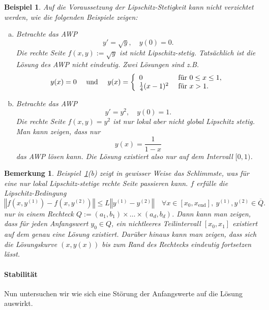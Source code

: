 \documentclass[
]{mycourse}
\theoremstyle{mythm}
\newtheorem{bemerkung}[theorem]{Bemerkung}
\newtheorem{beispiel}[theorem]{Beispiel}
\theoremstyle{break}
\newcommand{\norm}[1]{\left\Vert#1\right\Vert}		%
\begin{document}
\begin{beispiel}\label{bsp:PL}
Auf die Voraussetzung der Lipschitz-Stetigkeit kann nicht verzichtet werden, wie die folgenden
Beispiele zeigen:
\begin{enumerate}[(a)]
\item  Betrachte das AWP
\[
y'=\sqrt{y}, \quad y(0)=0.
\]
Die rechte Seite $f(x,y):=\sqrt{y}$ ist nicht Lipschitz-stetig. Tatsächlich ist die Lösung des AWP nicht eindeutig. Zwei Lösungen sind z.B.
\[
y(x)=0 \quad \mbox{ und } \quad y(x)=\left\{ \begin{array}{l l} 0 & \mbox{ für } 0\leq x\leq 1,\\ \frac{1}{4}(x-1)^2 & \mbox{ für } x>1.
\end{array} \right. 
\]
%
\item Betrachte das AWP
\[
y'=y^2,\quad y(0)=1.
\]
Die rechte Seite $f(x,y)=y^2$ ist nur lokal aber nicht global Lipschitz stetig. Man kann zeigen, dass nur 
\[
y(x)=\frac{1}{1-x}
\]
das AWP lösen kann. Die Lösung existiert also nur auf dem Intervall $[0,1)$.
\end{enumerate}
\end{beispiel}

\begin{bemerkung}
Beispiel~\ref{bsp:PL}(b) zeigt in gewisser Weise das Schlimmste, was für eine nur lokal Lipschitz-stetige rechte Seite passieren kann. 
$f$ erfülle die Lipschitz-Bedingung
\[
\norm{f(x,y^{(1)})-f(x,y^{(2)})}\leq L \norm{y^{(1)}-y^{(2)}} \quad \forall x\in [x_0,x_\mathrm{end}],\ y^{(1)},y^{(2)}\in \overline Q.
\]
nur in einem Rechteck $Q:=(a_1,b_1)\times \dots \times (a_d,b_d)$.
Dann kann man zeigen, dass für jeden Anfangswert $y_0\in Q$, ein nichtleeres Teilintervall $[x_0,x_1]$ existiert auf dem genau eine Lösung existiert.
Darüber hinaus kann man zeigen, dass sich die Lösungskurve $(x,y(x))$ bis zum Rand des Rechtecks eindeutig fortsetzen lässt.
\end{bemerkung}

\paragraph{Stabilität}

Nun untersuchen wir wie sich eine Störung der Anfangswerte auf die Lösung auswirkt.
\end{document}
